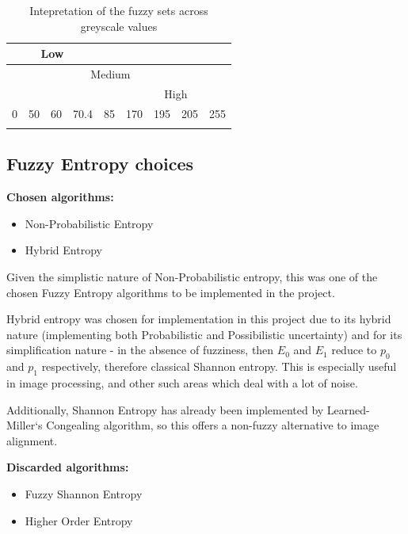 \begin{table}
  \center
  \begin{tabular}{ |l|l|l|l|l|l|l|l|l| }
    \hline
    \multicolumn{4}{|c|}{Low} & \multicolumn{5}{|c|}{} \\
    \hline
    \multicolumn{2}{|c|}{} & \multicolumn{5}{|c|}{Medium} & \multicolumn{2}{|c|}{}  \\
    \hline
    \multicolumn{5}{|c|}{} & \multicolumn{4}{|c|}{High} \\
    \hline
    0 & 50 & 60 & 70.4 & 85 & 170 & 195 & 205 & 255 \\
    \hline
    \cellcolor[gray]{0} & \cellcolor[gray]{0.19} & \cellcolor[gray]{0.24} & \cellcolor[gray]{0.28} & \cellcolor[gray]{0.33} & \cellcolor[gray]{0.66} & \cellcolor[gray]{0.76} & \cellcolor[gray]{0.8} & \cellcolor[gray]{1} \\ \hline
  \end{tabular}
\caption{Intepretation of the fuzzy sets across greyscale values}
\label{table:values}
\end{table}

\subsection{Fuzzy Entropy choices}

\textbf{Chosen algorithms:}
\begin{itemize}
  \item Non-Probabilistic Entropy
  \item Hybrid Entropy
\end{itemize}

Given the simplistic nature of Non-Probabilistic entropy, this was one of the chosen Fuzzy Entropy algorithms to be implemented in the project.

Hybrid entropy was chosen for implementation in this project due to its hybrid nature (implementing both Probabilistic and Possibilistic uncertainty) and for its simplification nature - in the absence of fuzziness, then $E_0$ and $E_1$ reduce to $p_0$ and $p_1$ respectively, therefore classical Shannon entropy. This is especially useful in image processing, and other such areas which deal with a lot of noise.

Additionally, Shannon Entropy has already been implemented by Learned-Miller`s Congealing algorithm, so this offers a non-fuzzy alternative to image alignment.

\textbf{Discarded algorithms:}
\begin{itemize}
  \item Fuzzy Shannon Entropy
  \item Higher Order Entropy
\end{itemize}

